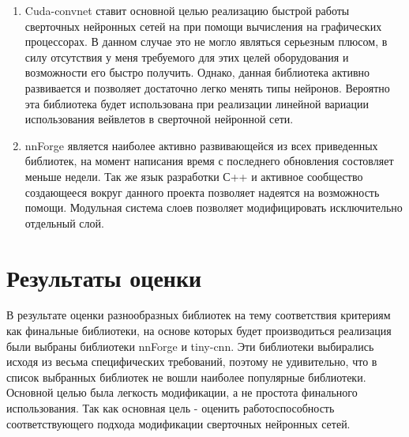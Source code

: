 \documentclass[utf8,usehyperref,14pt]{G7-32}
\begin{document}
\begin{enumerate}
\item Cuda-convnet ставит основной целью реализацию быстрой работы сверточных нейронных сетей на при помощи вычисления на графических процессорах. В данном случае это не могло являться серьезным плюсом, в силу отсутствия у меня требуемого для этих целей оборудования и возможности его быстро получить. Однако, данная библиотека активно развивается и позволяет достаточно легко менять типы нейронов. Вероятно эта библиотека будет использована при реализации линейной вариации использования вейвлетов в сверточной нейронной сети.
\item nnForge является наиболее активно развивающейся из всех приведенных библиотек, на момент написания время с последнего обновления состовляет меньше недели. Так же язык разработки С++ и активное сообщество создающееся вокруг данного проекта позволяет надеятся на возможность помощи. Модульная система слоев позволяет модифицировать исключительно отдельный слой.
\end{enumerate}


\section{Результаты оценки}
В результате оценки разнообразных библиотек на тему соответствия критериям как финальные библиотеки, на основе которых будет производиться реализация были выбраны библиотеки nnForge и tiny-cnn. Эти библиотеки выбирались исходя из весьма специфических требований, поэтому не удивительно, что в список выбранных библиотек не вошли наиболее популярные библиотеки. Основной целью была легкость модификации, а не простота финального использования. Так как основная цель - оценить работоспособность соответствующего подхода модификации сверточных нейронных сетей.
\end{document}
